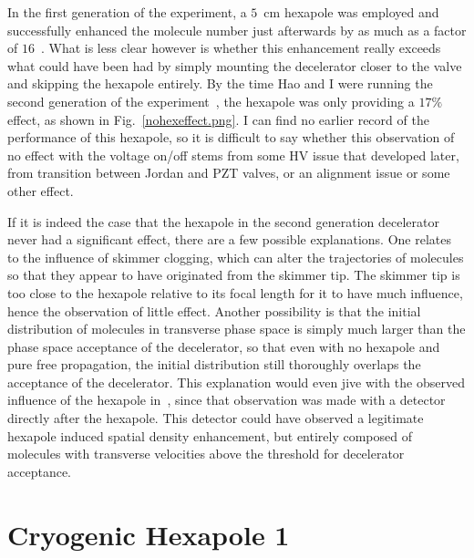 In the first generation of the experiment, a $5$~cm hexapole was employed and successfully enhanced the molecule number just afterwards by as much as a factor of $16$~\citep[Fig.~6]{Bochinski2004}.
What is less clear however is whether this enhancement really exceeds what could have been had by simply mounting the decelerator closer to the valve and skipping the hexapole entirely.
By the time Hao and I were running the second generation of the experiment~\cite{Sawyer2007}, the hexapole was only providing a $17\%$ effect, as shown in Fig.~\ref{nohexeffect.png}.
I can find no earlier record of the performance of this hexapole, so it is difficult to say whether this observation of no effect with the voltage on/off stems from some HV issue that developed later, from transition between Jordan and PZT valves, or an alignment issue or some other effect.


If it is indeed the case that the hexapole in the second generation decelerator never had a significant effect, there are a few possible explanations.
One relates to the influence of skimmer clogging, which can alter the trajectories of molecules so that they appear to have originated from the skimmer tip.
The skimmer tip is too close to the hexapole relative to its focal length for it to have much influence, hence the observation of little effect.
Another possibility is that the initial distribution of molecules in transverse phase space is simply much larger than the phase space acceptance of the decelerator, so that even with no hexapole and pure free propagation, the initial distribution still thoroughly overlaps the acceptance of the decelerator.
This explanation would even jive with the observed influence of the hexapole in~\citep[Fig.~6]{Bochinski2004}, since that observation was made with a detector directly after the hexapole.
This detector could have observed a legitimate hexapole induced spatial density enhancement, but entirely composed of molecules with transverse velocities above the threshold for decelerator acceptance.


\section{Cryogenic Hexapole 1}

